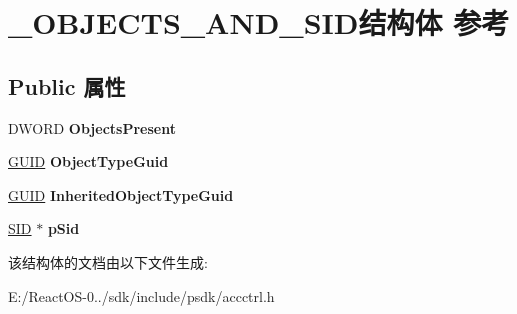 \hypertarget{struct___o_b_j_e_c_t_s___a_n_d___s_i_d}{}\section{\+\_\+\+O\+B\+J\+E\+C\+T\+S\+\_\+\+A\+N\+D\+\_\+\+S\+I\+D结构体 参考}
\label{struct___o_b_j_e_c_t_s___a_n_d___s_i_d}
\subsection*{Public 属性}
\begin{DoxyCompactItemize}
\item 
\mbox{\label{struct___o_b_j_e_c_t_s___a_n_d___s_i_d_a9af9218e7182db01a26a8a74cb07619d}} 
D\+W\+O\+RD {\bfseries Objects\+Present}
\item 
\mbox{\label{struct___o_b_j_e_c_t_s___a_n_d___s_i_d_a99eb36f841d90a5b4610474f1b65949b}} 
\hyperlink{interface_g_u_i_d}{G\+U\+ID} {\bfseries Object\+Type\+Guid}
\item 
\mbox{\label{struct___o_b_j_e_c_t_s___a_n_d___s_i_d_a6a89107af1c35284c53bb568038dc1fb}} 
\hyperlink{interface_g_u_i_d}{G\+U\+ID} {\bfseries Inherited\+Object\+Type\+Guid}
\item 
\mbox{\label{struct___o_b_j_e_c_t_s___a_n_d___s_i_d_a8119a8bfd18e54c176b386209a6f2e78}} 
\hyperlink{struct___s_i_d}{S\+ID} $\ast$ {\bfseries p\+Sid}
\end{DoxyCompactItemize}


该结构体的文档由以下文件生成\+:\begin{DoxyCompactItemize}
\item 
E\+:/\+React\+O\+S-\/0../sdk/include/psdk/accctrl.\+h\end{DoxyCompactItemize}
